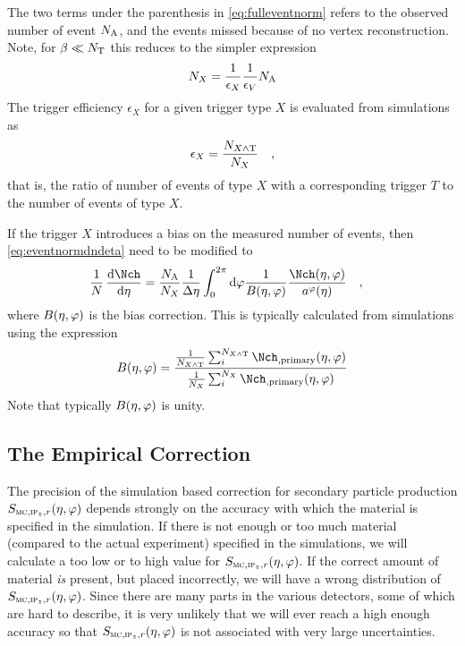The two terms under the parenthesis in \eqref{eq:fulleventnorm} refers
to the observed number of event ${N_{\text{A}}}$, and the events missed because
of no vertex reconstruction.  Note, for $\beta\ll{\ensuremath N_{\text{T}}}{}$
this reduces to the simpler expression
$$
{N_{X}} = \frac1{\epsilon_X}\frac1{\epsilon_V}{N_{\text{A}}}{}
$$
The trigger efficiency $\epsilon_X$ for a given trigger type $X$ is
evaluated from simulations as
\begin{align*}
  \epsilon_X = \frac{{N_{X\wedge \text{T}}}}{{N_{X}}}\quad,
\end{align*}
that is, the ratio of number of events of type $X$ with a
corresponding trigger $T$ to the number of events of type $X$.

If the trigger $X$ introduces a bias on the measured number of events,
then \eqref{eq:eventnormdndeta} need to be modified to 
\begin{align}
  \ndndeta &= 
  \frac{\NA}{\N{X}{}}\frac1{\Delta\eta} \int_0^{2\pi} \text{d}\varphi
  \frac{1}{B\etaphi}\frac{\dndetadphi}{\PhiAcc}
  \label{eq:eventnormdndeta2}\quad,
\end{align}
where $B(\eta,\varphi)$ is the bias correction.  This is typically
calculated from simulations using the expression 
\begin{align*}
  B\etaphi = \frac{\frac{1}{\N{X\wedge \text{T}}{}}\sum_i^{\N{X\wedge
        \text{T}}{}}
    \mult[,\text{primary}]\etaphi}{\frac{1}{\N{X}{}}\sum_i^{\N{X}{}}
    \mult[,\text{primary}]\etaphi}
\end{align*}
Note that typically $B(\eta,\varphi)$ is unity.

\subsection{The Empirical Correction} 
\label{sec:sub:empirical} 

The precision of the simulation based correction for secondary
particle production $\SecMap{}$ depends strongly on the accuracy with
which the material is specified in the simulation.  If there is not
enough or too much material (compared to the actual experiment)
specified in the simulations, we will calculate a too low or to high
value for $\SecMap$.  If the correct amount of material \emph{is}
present, but placed incorrectly, we will have a wrong distribution of
$\SecMap$.  Since there are many parts in the various detectors, some
of which are hard to describe, it is very unlikely that we will ever
reach a high enough accuracy so that $\SecMap$ is not associated with
very large uncertainties.

